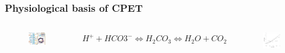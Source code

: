 \documentclass[10pt]{beamer}
\begin{document}
\begin{frame}
	\frametitle{Physiological basis of CPET} 
	\begin{columns}

		\begin{figure}
			\includegraphics[width=\linewidth]{CellRespiration}
		\end{figure}
		{\scriptsize $H^+ + HCO3^- \Longleftrightarrow H_2CO_3 \Longleftrightarrow H_2O + CO_2$}

	\begin{figure}[htbp]
		\includegraphics[width=\linewidth]{../Figures/cpet_vslope}
	\end{figure}
	
	\end{columns}

\end{frame}
\end{document}
